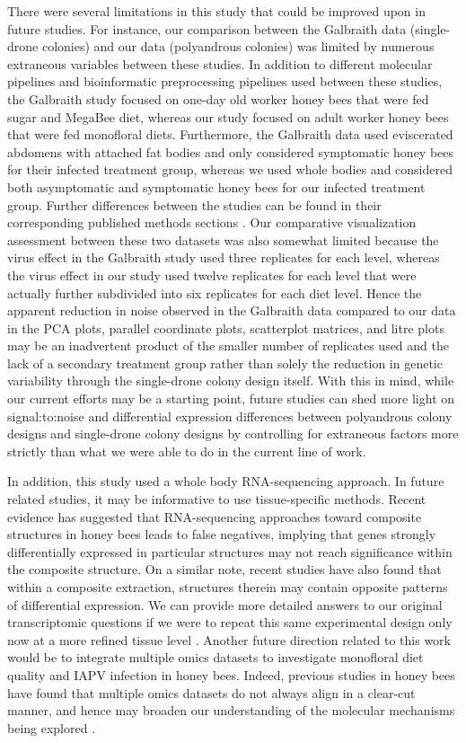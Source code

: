 \documentclass{bmcart}
\begin{document}
\begin{linenumbers}
\begin{doublespacing}
There were several limitations in this study that could be improved upon in future studies. For instance, our comparison between the Galbraith data (single-drone colonies) and our data (polyandrous colonies) was limited by numerous extraneous variables between these studies. In addition to different molecular pipelines and bioinformatic preprocessing pipelines used between these studies, the Galbraith study focused on one-day old worker honey bees that were fed sugar and MegaBee diet, whereas our study focused on adult worker honey bees that were fed monofloral diets. Furthermore, the Galbraith data used eviscerated abdomens with attached fat bodies and only considered symptomatic honey bees for their infected treatment group, whereas we used whole bodies and considered both asymptomatic and symptomatic honey bees for our infected treatment group. Further differences between the studies can be found in their corresponding published methods sections \cite{adamInt, galbraith}. Our comparative visualization assessment between these two datasets was also somewhat limited because the virus effect in the Galbraith study used three replicates for each level, whereas the virus effect in our study used twelve replicates for each level that were actually further subdivided into six replicates for each diet level. Hence the apparent reduction in noise observed in the Galbraith data compared to our data in the PCA plots, parallel coordinate plots, scatterplot matrices, and litre plots may be an inadvertent product of the smaller number of replicates used and the lack of a secondary treatment group rather than solely the reduction in genetic variability through the single-drone colony design itself. With this in mind, while our current efforts may be a starting point, future studies can shed more light on signal:to:noise and differential expression differences between polyandrous colony designs and single-drone colony designs by controlling for extraneous factors more strictly than what we were able to do in the current line of work. 

In addition, this study used a whole body RNA-sequencing approach. In future related studies, it may be informative to use tissue-specific methods. Recent evidence has suggested that RNA-sequencing approaches toward composite structures in honey bees leads to false negatives, implying that genes strongly differentially expressed in particular structures may not reach significance within the composite structure. On a similar note, recent studies have also found that within a composite extraction, structures therein may contain opposite patterns of differential expression. We can provide more detailed answers to our original transcriptomic questions if we were to repeat this same experimental design only now at a more refined tissue level \cite{tissueLevel}. Another future direction related to this work would be to integrate multiple omics datasets to investigate monofloral diet quality and IAPV infection in honey bees. Indeed, previous studies in honey bees have found that multiple omics datasets do not always align in a clear-cut manner, and hence may broaden our understanding of the molecular mechanisms being explored \cite{galbraith}.


\end{doublespacing}
\end{linenumbers}
\end{document}
